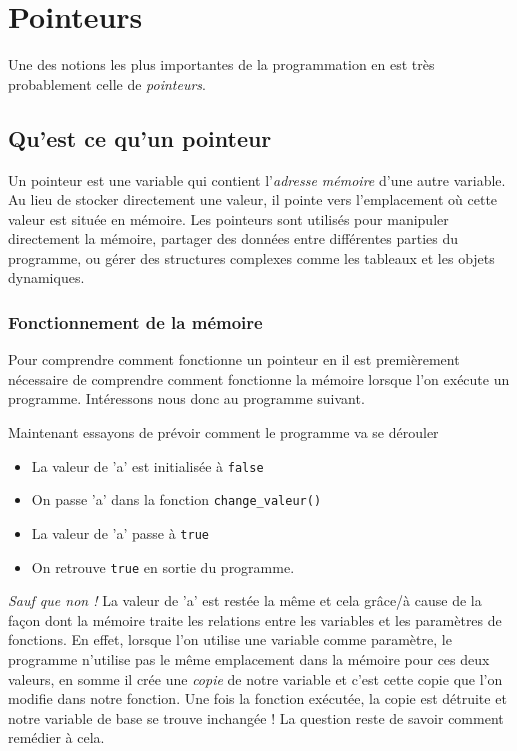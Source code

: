 \chapter{Pointeurs}
Une des notions les plus importantes de la programmation en \cpp est très probablement celle de \emph{pointeurs}.

\section{Qu'est ce qu'un pointeur}
Un pointeur est une variable qui contient l’\emph{adresse mémoire} d’une autre variable. Au lieu de stocker directement une valeur, il pointe vers l’emplacement où cette valeur est située en mémoire. Les pointeurs sont utilisés pour manipuler directement la mémoire, partager des données entre différentes parties du programme, ou gérer des structures complexes comme les tableaux et les objets dynamiques.

\subsection{Fonctionnement de la mémoire}
Pour comprendre comment fonctionne un pointeur en \cpp il est premièrement nécessaire de comprendre comment fonctionne la mémoire lorsque l'on exécute un programme. Intéressons nous donc au programme suivant.



Maintenant essayons de prévoir comment le programme va se dérouler

\begin{itemize}
	\item La valeur de 'a' est initialisée à \lstinline|false|
	\item On passe 'a' dans la fonction \lstinline|change_valeur()|
	\item La valeur de 'a' passe à \lstinline|true|
	\item On retrouve \lstinline|true| en sortie du programme.
\end{itemize} 

\emph{Sauf que non !} La valeur de 'a' est restée la même et cela grâce/à cause de la façon dont la mémoire traite les relations entre les variables et les paramètres de fonctions. En effet, lorsque l'on utilise une variable comme paramètre, le programme n'utilise pas le même emplacement dans la mémoire pour ces deux valeurs, en somme il crée une \emph{copie} de notre variable et c'est cette copie que l'on modifie dans notre fonction. Une fois la fonction exécutée, la copie est détruite et notre variable de base se trouve inchangée ! La question reste de savoir comment remédier à cela.

